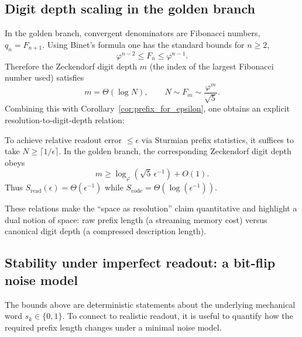 \subsection{Digit depth scaling in the golden branch}
In the golden branch, convergent denominators are Fibonacci numbers, $q_n=F_{n+1}$.
Using Binet's formula one has the standard bounds for $n\ge 2$,
\begin{equation}
\varphi^{n-2}\le F_n\le \varphi^{n-1}.
\label{eq:fibonacci_bounds}
\end{equation}
Therefore the Zeckendorf digit depth $m$ (the index of the largest Fibonacci number used) satisfies
\begin{equation}
 m = \Theta(\log N),\qquad N\sim F_m\sim \frac{\varphi^m}{\sqrt{5}}.
\label{eq:zeckendorf_log_scaling}
\end{equation}
Combining this with Corollary~\ref{cor:prefix_for_epsilon}, one obtains an explicit resolution-to-digit-depth relation:

\begin{proposition}
\label{prop:resolution_digit_depth}
To achieve relative readout error $\le\epsilon$ via Sturmian prefix statistics, it suffices to take $N\ge \lceil 1/\epsilon\rceil$.
In the golden branch, the corresponding Zeckendorf digit depth obeys
\begin{equation}
 m \ge \log_{\varphi}\!\left(\sqrt{5}\,\epsilon^{-1}\right) + O(1).
\end{equation}
Thus $S_{\mathrm{read}}(\epsilon)=\Theta(\epsilon^{-1})$ while $S_{\mathrm{code}}=\Theta(\log(\epsilon^{-1}))$.
\end{proposition}

These relations make the ``space as resolution'' claim quantitative and highlight a dual notion of space: raw prefix length (a streaming memory cost) versus canonical digit depth (a compressed description length).

\subsection{Stability under imperfect readout: a bit-flip noise model}
\label{app:readout_noise}
The bounds above are deterministic statements about the underlying mechanical word $s_k\in\{0,1\}$.
To connect to realistic readout, it is useful to quantify how the required prefix length changes under a minimal noise model.

